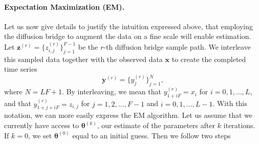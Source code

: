 \documentclass{article}
\newcommand{\btheta}{\ensuremath{\bm{\theta}}}
\newcommand{\bx}{\ensuremath{\mathbf{x}}}
\newcommand{\by}{\ensuremath{\mathbf{y}}}
\newcommand{\bz}{\ensuremath{\mathbf{z}}}
\begin{document}
\paragraph{Expectation Maximization (EM).} Let us now give details to justify the intuition expressed above, that employing the diffusion bridge to augment the data on a fine scale will enable estimation.  Let $\bz^{(r)} = \{z_{i,j}^{(r)}\}_{j=1}^{F-1}$ be the $r$-th diffusion bridge sample path.  We interleave this sampled data together with the observed data $\bx$ to create the completed time series
\begin{equation*}
\by^{(r)} = \{y_j^{(r)}\}_{j=1}^N,
\end{equation*}
where $N = LF + 1$.  By interleaving, we mean that $y_{1 + i F}^{(r)} = x_i$ for $i = 0, 1, \ldots, L$, and that $y_{1 + j + i F}^{(r)} = z_{i, j}$ for $j = 1, 2, \ldots, F-1$ and $i = 0, 1, \ldots, L-1$.  With this notation, we can more easily express the EM algorithm.  Let us assume that we currently have access to $\btheta^{(k)}$, our estimate of the parameters after $k$ iterations.  If $k=0$, we set $\btheta^{(0)}$ equal to an initial guess.  Then we follow two steps
\end{document}
